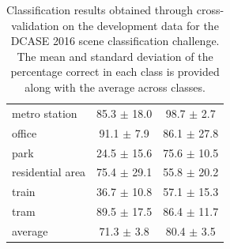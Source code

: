 \documentclass{article}
\begin{document}
\begin{sloppy}
\begin{table}[!htbp]
\begin{tabular}{lcc}
metro station & 85.3 $\pm$ 18.0 & 98.7 $\pm$  \phantom{0}2.7 \\

office & 91.1 $\pm$ \phantom{0}7.9 & 86.1 $\pm$ 27.8 \\

park & 24.5 $\pm$ 15.6 & 75.6 $\pm$ 10.5 \\

residential area & 75.4 $\pm$ 29.1 & 55.8 $\pm$ 20.2 \\

train & 36.7 $\pm$ 10.8 & 57.1 $\pm$ 15.3 \\

tram & 89.5 $\pm$ 17.5 & 86.4 $\pm$ 11.7 \\

\bottomrule

average & 71.3 $\pm$  \phantom{0}3.8 & 80.4 $\pm$  \phantom{0}3.5
\end{tabular}
\caption{\label{table:development-results} Classification results obtained through cross-validation on the development data for the DCASE 2016 scene classification challenge. The mean and standard deviation of the percentage correct in each class is provided along with the average across classes.}
\end{table}




\end{sloppy}
\end{document}
